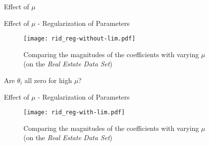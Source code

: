 \documentclass{beamer}
\begin{document}
\begin{frame}{Effect of $\mu$}
\vspace{0.4cm}
\end{frame}


\begin{frame}{Effect of $\mu$ - Regularization of Parameters}
\vspace{0.4cm}
\begin{figure}\texttt{[image: rid\_reg-without-lim.pdf]}\caption{Comparing the magnitudes of the coefficients with varying $\mu$\\(on the \emph{Real Estate Data Set})}
\end{figure}
\pause Are $\theta_{i}$ all zero for high $\mu$?
\end{frame}

\begin{frame}{Effect of $\mu$ - Regularization of Parameters}
\vspace{0.4cm}
\begin{figure}\texttt{[image: rid\_reg-with-lim.pdf]}\caption{Comparing the magnitudes of the coefficients with varying $\mu$\\(on the \emph{Real Estate Data Set})}
\end{figure}
\end{frame}
\end{document}
